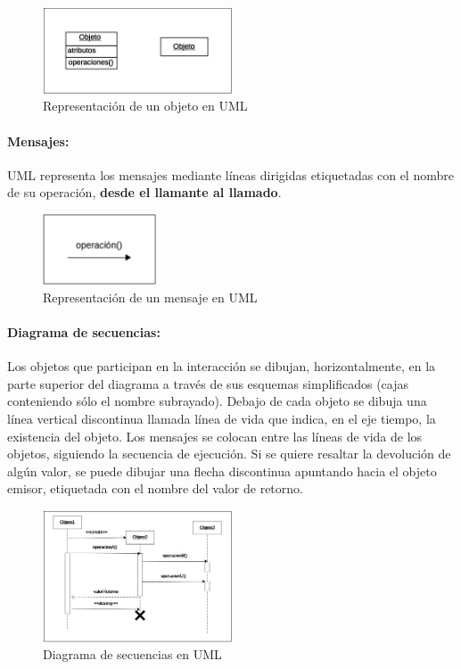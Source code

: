 \begin{figure}[ht!]  \centering
  \includegraphics[width=0.5\textwidth]{images/fig21}
  \caption{Representación de un objeto en UML}
  \label{fig:21}
\end{figure}

\vspace{5mm}

\paragraph{Mensajes:}
UML representa los mensajes mediante líneas dirigidas etiquetadas con
el nombre de su operación, \textbf{desde el llamante al llamado}.

\begin{figure}[ht!]  \centering
  \includegraphics[width=0.3\textwidth]{images/fig22}
  \caption{Representación de un mensaje en UML}
  \label{fig:22}
\end{figure}

\paragraph{Diagrama de secuencias:}
Los objetos que participan en la interacción se dibujan,
horizontalmente, en la parte superior del diagrama a través de sus
esquemas simplificados (cajas conteniendo sólo el nombre
subrayado). Debajo de cada objeto se dibuja una línea vertical
discontinua llamada línea de vida que indica, en el eje tiempo, la
existencia del objeto.
Los mensajes se colocan entre las líneas de vida de los objetos,
siguiendo la secuencia de ejecución. Si se quiere resaltar la
devolución de algún valor, se puede dibujar una flecha discontinua
apuntando hacia el objeto emisor, etiquetada con el nombre del valor
de retorno.

\begin{figure}[ht!]  \centering
  \includegraphics[width=0.5\textwidth]{images/fig23}
  \caption{Diagrama de secuencias en UML}
  \label{fig:23}
\end{figure}


